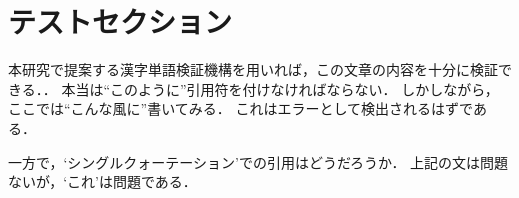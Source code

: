 \section{テストセクション}

本研究で提案する漢字単語検証機構を用いれば，この文章の内容を十分に検証できる．．
本当は``このように''引用符を付けなければならない．
しかしながら，ここでは“こんな風に”書いてみる．
これはエラーとして検出されるはずである．

一方で，`シングルクォーテーション'での引用はどうだろうか．
上記の文は問題ないが，‘これ’は問題である．
